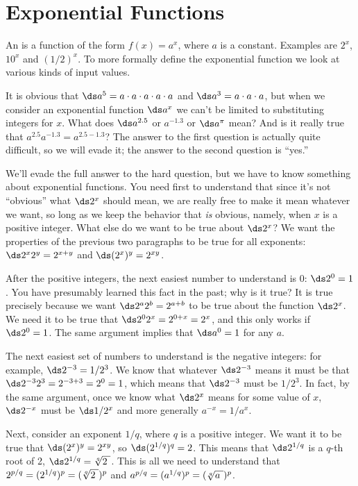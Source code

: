 \section{Exponential Functions}\label{sec:ExpFunctions}
An  is a function of the form $f(x)=a^x$, where $a$ is a constant.
Examples are $2^x$, $10^x$ and $(1/2)^x$.
To more formally define the exponential function we look at various kinds of input values.

It is obvious
that $\ds a^5=a\cdot a\cdot a\cdot a\cdot a$ and $\ds a^3=a\cdot a\cdot a$, 
but when we consider an exponential function $\ds a^x$ we can't
be limited to substituting integers for $x$. What does $\ds a^{2.5}$ or
$a^{-1.3}$ or $\ds a^\pi$ mean? And is it really true that
$a^{2.5}a^{-1.3}=a^{2.5-1.3}$? The answer to the first question is
actually quite difficult, so we will evade it; the answer to the
second question is ``yes.''

We'll evade the full answer to the hard question, but we have to know
something about exponential functions. You need first to understand
that since it's not ``obvious'' what $\ds 2^x$ should mean, we are really
free to make it mean whatever we want, so long as we keep the behavior
that {\em is} obvious, namely, when $x$ is a positive integer.
What else do we want to be true about $\ds 2^x$? We
want the properties of the previous two paragraphs to be true for all
exponents: $\ds 2^x2^y=2^{x+y}$ and $\ds (2^x)^y=2^{xy}$.

After the positive integers, the next easiest
number to understand is 0: $\ds 2^0=1$. You have presumably learned this
fact in the past; why is it true?  It
is true precisely because we want $\ds 2^a2^b=2^{a+b}$ to be true about
the function $\ds 2^x$. We need it to be true that $\ds 2^02^x=2^{0+x}=2^x$,
and this only works if $\ds 2^0=1$. The same argument implies that $\ds a^0=1$
for any $a$.

The next easiest set of numbers to
understand is the negative integers: for example, $\ds 2^{-3}=1/2^3$. 
We know that whatever $\ds 2^{-3}$ means it must be
that $\ds 2^{-3}2^{3}=2^{-3+3}=2^0=1$, which means that $\ds 2^{-3}$ must be
$1/2^3$. In fact, by the same argument, once we know what $\ds 2^x$ means
for some value of $x$, $\ds 2^{-x}$ must be $\ds 1/2^{x}$ and more generally
$a^{-x}=1/a^x$.

Next, consider an exponent $1/q$, where $q$ is a positive integer. We
want it to be true that $\ds (2^x)^y=2^{xy}$, so $\ds
(2^{1/q})^q=2$. This means that $\ds 2^{1/q}$ is a $q$-th root of 2,
$\ds 2^{1/q}=\root q\of{2\ }$. This is all we need to understand that
$2^{p/q}=(2^{1/q})^p=(\root q\of{2\ })^p$ and
$a^{p/q}=(a^{1/q})^p=(\root q\of{a\ })^p$.

